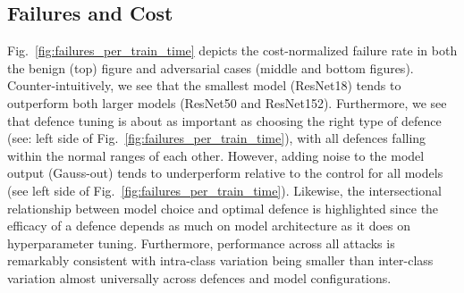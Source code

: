 \subsection{Failures and Cost}


Fig.~\ref{fig:failures_per_train_time} depicts the cost-normalized failure rate in both the benign (top) figure and adversarial cases (middle and bottom figures). Counter-intuitively, we see that the smallest model (ResNet18) tends to outperform both larger models (ResNet50 and ResNet152). Furthermore, we see that defence tuning is about as important as choosing the right type of defence (see: left side of Fig.~\ref{fig:failures_per_train_time}), with all defences falling within the normal ranges of each other. However, adding noise to the model output (Gauss-out) tends to underperform relative to the control for all models (see left side of Fig.~\ref{fig:failures_per_train_time}). Likewise, the intersectional relationship between model choice and optimal defence is highlighted since the efficacy of a defence depends as much on model architecture as it does on hyperparameter tuning.  Furthermore, performance across all attacks is remarkably consistent with intra-class variation being smaller than inter-class variation almost universally across defences and model configurations. 

